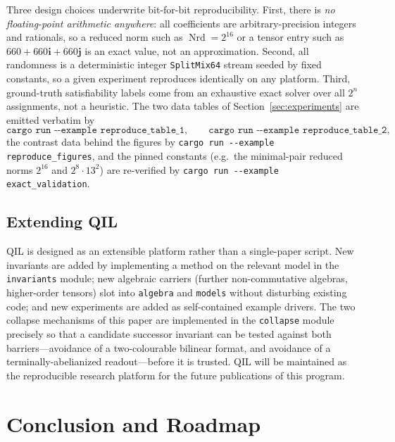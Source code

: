 \documentclass[pdflatex,sn-mathphys-num]{sn-jnl}
\theoremstyle{thmstyleone}%
\theoremstyle{thmstyletwo}%
\theoremstyle{thmstylethree}%
\newcommand{\Nrd}{\operatorname{Nrd}}
\newcommand{\bi}{\mathbf{i}}
\newcommand{\bj}{\mathbf{j}}
\begin{document}
Three design choices underwrite bit-for-bit reproducibility. First, there is
\emph{no floating-point arithmetic anywhere}: all coefficients are
arbitrary-precision integers and rationals, so a reduced norm such as
$\Nrd = 2^{16}$ or a tensor entry such as $660 + 660\bi + 660\bj$ is an exact
value, not an approximation. Second, all randomness is a deterministic
integer \texttt{SplitMix64} stream seeded by fixed constants, so a given
experiment reproduces identically on any platform. Third, ground-truth
satisfiability labels come from an exhaustive exact solver over all $2^n$
assignments, not a heuristic. The two data tables of
Section~\ref{sec:experiments} are emitted verbatim by
\[
  \texttt{cargo run -{}-example reproduce\_table\_1},\qquad
  \texttt{cargo run -{}-example reproduce\_table\_2},
\]
the contrast data behind the figures by
\texttt{cargo run -{}-example reproduce\_figures}, and the pinned constants
(e.g.\ the minimal-pair reduced norms $2^{16}$ and $2^{8}\cdot 13^{2}$) are
re-verified by \texttt{cargo run -{}-example exact\_validation}.

\subsection{Extending QIL}

QIL is designed as an extensible platform rather than a single-paper script.
New invariants are added by implementing a method on the relevant model in the
\texttt{invariants} module; new algebraic carriers (further non-commutative
algebras, higher-order tensors) slot into \texttt{algebra} and \texttt{models}
without disturbing existing code; and new experiments are added as
self-contained example drivers. The two collapse mechanisms of this paper are
implemented in the \texttt{collapse} module precisely so that a candidate
successor invariant can be tested against both barriers---avoidance of a
two-colourable bilinear format, and avoidance of a terminally-abelianized
readout---before it is trusted. QIL will be maintained as the reproducible
research platform for the future publications of this program.

\section{Conclusion and Roadmap}\label{sec:conclusion}
\end{document}

